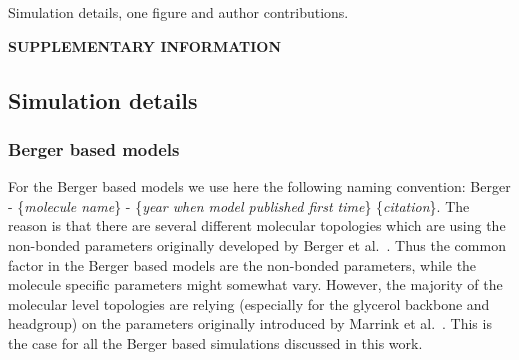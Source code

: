 \documentclass[journal=jacsat,manuscript=article]{achemso}
\begin{document}
\begin{suppinfo}

Simulation details, one figure and author contributions.


\end{suppinfo}



\newpage
\begin{center}
{\bf SUPPLEMENTARY INFORMATION}
\end{center}
\subsection{Simulation details} 
\subsubsection{Berger based models}
For the Berger based models we use here the following naming convention: 
Berger - \{{\it molecule name}\} - \{{\it year when model published first time}\} \{{\it citation}\}.
The reason is that there are several different molecular topologies which are using the non-bonded parameters originally
developed by Berger et al.~\cite{berger97}. Thus the common factor in the Berger based models are the non-bonded parameters,
while the molecule specific parameters might somewhat vary. However, the majority of the molecular level topologies are 
relying (especially for the glycerol backbone and headgroup) on the parameters originally introduced by Marrink et al.~\cite{marrink98}.
This is the case for all the Berger based simulations discussed in this work.
\end{document}
